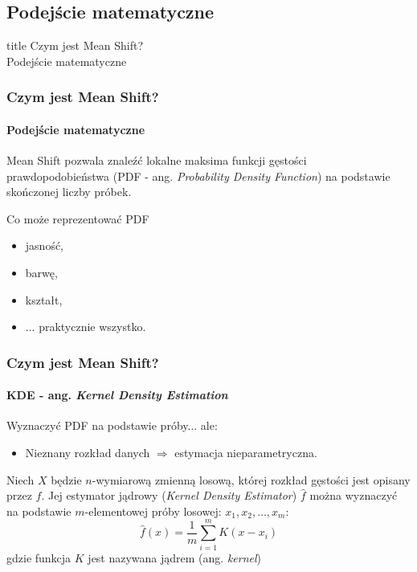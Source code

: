 \documentclass{beamer}
\begin{document}
	\subsection{Podejście matematyczne}
	\begin{frame}
		\begin{beamercolorbox}[colsep=-4bp,rounded=true,shadow=true,ht=1cm,dp=0.3cm,center]{title}
			  Czym jest Mean Shift?\\
			  Podejście matematyczne
		\end{beamercolorbox}
	\end{frame}
	
	\begin{frame}
		\frametitle{Czym jest Mean Shift?}
		\framesubtitle{Podejście matematyczne}
		Mean Shift pozwala znaleźć lokalne maksima funkcji gęstości prawdopodobieństwa (PDF - ang. \textit{Probability Density Function}) na podstawie skończonej liczby próbek.
		
		\begin{block}{Co może reprezentować PDF}
			\begin{itemize}
				\item jasność,
				\item barwę,
				\item kształt,
				\item ... praktycznie wszystko.
			\end{itemize}
		\end{block}
	\end{frame}
	
	\begin{frame}
		\frametitle{Czym jest Mean Shift?}
		\framesubtitle{KDE - ang. \textit{Kernel Density Estimation}}
		Wyznaczyć PDF na podstawie próby... ale:
		\begin{itemize}
			\item Nieznany rozkład danych \(\Rightarrow\) estymacja nieparametryczna.
		\end{itemize}
		Niech \(X\) będzie \(n\)-wymiarową zmienną losową, której rozkład gęstości jest opisany przez \(f\). Jej estymator jądrowy (\textit{Kernel Density Estimator}) \(\hat{f}\) można wyznaczyć na podstawie \(m\)-elementowej próby losowej: \(x_{1},x_{2},\ldots,x_{m}\):
		\begin{equation}\label{eq:KDE}
		\hat{f}(x) = \frac{1}{m}\sum_{i=1}^{m}K\left(x - x_{i}\right)
		\end{equation}
		gdzie funkcja \(K\) jest nazywana jądrem (ang. \textit{kernel})
	\end{frame}
	
\end{document}
